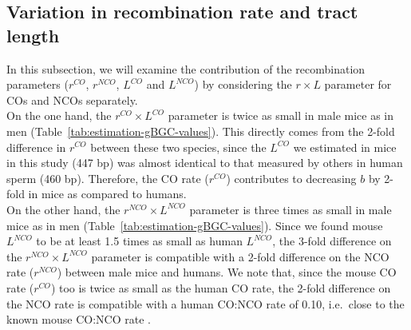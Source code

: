 \subsection{Variation in recombination rate and tract length}


In this subsection, we will examine the contribution of the recombination parameters ($r^{CO}$, $r^{NCO}$, $L^{CO}$ and $L^{NCO}$) by considering the $r \times L$ parameter for COs and NCOs separately.\\

On the one hand, the $r^{CO} \times L^{CO}$ parameter is twice as small in male mice as in men (Table~\ref{tab:estimation-gBGC-values}).
This directly comes from the 2-fold difference in $r^{CO}$ between these two species, since the $L^{CO}$ we estimated in mice in this study (447 bp) was almost identical to that measured by others in human sperm (460 bp).
Therefore, the CO rate ($r^{CO}$) contributes to decreasing $b$ by 2-fold in mice as compared to humans.\\

On the other hand, the $r^{NCO} \times L^{NCO}$ parameter is three times as small in male mice as in men (Table~\ref{tab:estimation-gBGC-values}).
Since we found mouse $L^{NCO}$ to be at least 1.5 times as small as human $L^{NCO}$, the 3-fold difference on the $r^{NCO} \times L^{NCO}$ parameter is compatible with a 2-fold difference on the NCO rate ($r^{NCO}$) between male mice and humans.
We note that, since the mouse CO rate ($r^{CO}$) too is twice as small as the human CO rate, the 2-fold difference on the NCO rate is compatible with a human CO:NCO rate of 0.10, i.e.\ close to the known mouse CO:NCO rate \citep{cole2010comprehensive}.





